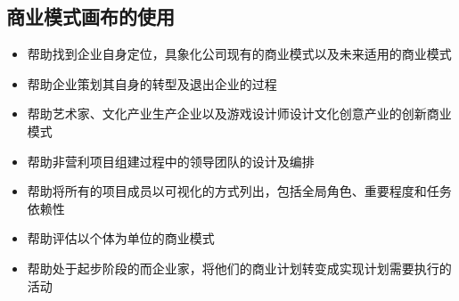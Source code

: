 	\subsection{商业模式画布的使用}
	\begin{itemize}
		\item 帮助找到企业自身定位，具象化公司现有的商业模式以及未来适用的商业模式
		\item 帮助企业策划其自身的转型及退出企业的过程
		\item 帮助艺术家、文化产业生产企业以及游戏设计师设计文化创意产业的创新商业模式
		\item 帮助非营利项目组建过程中的领导团队的设计及编排
		\item 帮助将所有的项目成员以可视化的方式列出，包括全局角色、重要程度和任务依赖性
		\item 帮助评估以个体为单位的商业模式
		\item 帮助处于起步阶段的而企业家，将他们的商业计划转变成实现计划需要执行的活动
	\end{itemize}


